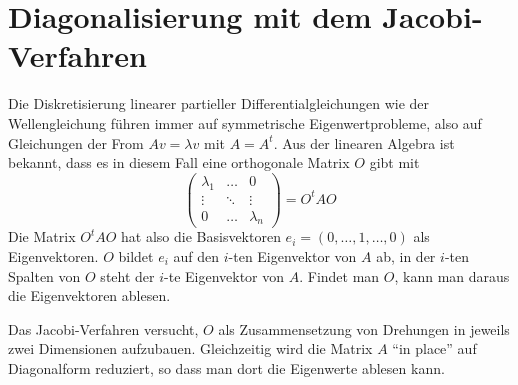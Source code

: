 %
%
%
\section{Diagonalisierung mit dem Jacobi-Verfahren
\label{buch:section:jacobi}}
Die Diskretisierung linearer partieller Differentialgleichungen wie
der Wellengleichung führen immer auf symmetrische Eigenwertprobleme,
also auf Gleichungen der From $Av=\lambda v$ mit $A=A^t$. Aus der
linearen Algebra ist bekannt, dass es in diesem Fall eine orthogonale
Matrix $O$ gibt mit
\[
\begin{pmatrix}
\lambda_1&\dots&0\\
\vdots&\ddots&\vdots\\
0&\dots&\lambda_n
\end{pmatrix}=O^tAO
\]
Die Matrix $O^tAO$ hat also die Basisvektoren $e_i=(0,\dots,1,\dots,0)$
als Eigenvektoren. $O$ bildet $e_i$ auf den $i$-ten Eigenvektor von $A$
ab, in der $i$-ten Spalten von $O$ steht der $i$-te Eigenvektor von $A$.
Findet man $O$, kann man daraus die Eigenvektoren ablesen.

Das Jacobi-Verfahren versucht, $O$ als Zusammensetzung von Drehungen
in jeweils zwei Dimensionen aufzubauen. Gleichzeitig wird die
Matrix $A$ ``in place'' auf Diagonalform reduziert, so dass man dort
die Eigenwerte ablesen kann.

